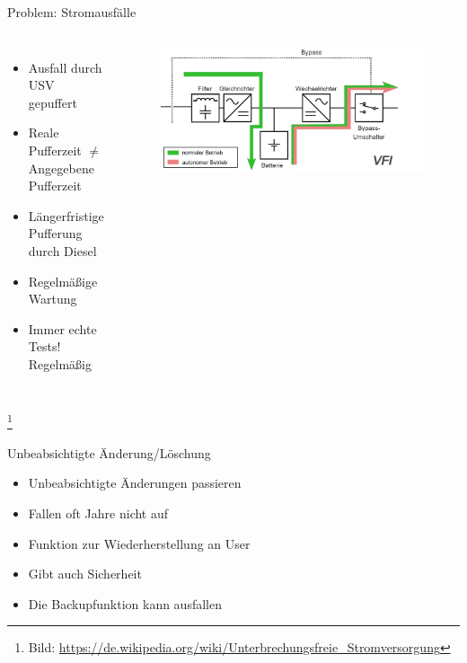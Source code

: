 \documentclass[10pt]{beamer}
\newcommand\blfootnote[1]{%
	\begingroup
	\renewcommand\thefootnote{}\footnote{#1}%
	\addtocounter{footnote}{-1}%
	\endgroup
}
\begin{document}
%
%
\begin{frame}[fragile]{Problem: Stromausfälle}

\begin{columns}[T,c,onlytextwidth]
	\begin{itemize}
		\item Ausfall durch USV gepuffert
		\item Reale Pufferzeit $\neq$ Angegebene Pufferzeit
		\item Längerfristige Pufferung durch Diesel
		\item Regelmäßige Wartung
		\item Immer echte Tests! Regelmäßig 
	\end{itemize}
	\begin{figure}
		\includegraphics[width=1\textwidth]{images/usv}
	\end{figure}
\end{columns}

\blfootnote{Bild: \href{https://de.wikipedia.org/wiki/Unterbrechungsfreie_Stromversorgung}{https://de.wikipedia.org/wiki/Unterbrechungsfreie\_Stromversorgung}}
\end{frame}

%
%
\begin{frame}[fragile]{Unbeabsichtigte Änderung/Löschung}
	\begin{itemize}
	\item Unbeabsichtigte Änderungen passieren
	\item Fallen oft Jahre nicht auf
	\item Funktion zur Wiederherstellung an User
	\item Gibt auch Sicherheit
	\item Die Backupfunktion kann ausfallen 
\end{itemize}
\end{frame}
\end{document}
